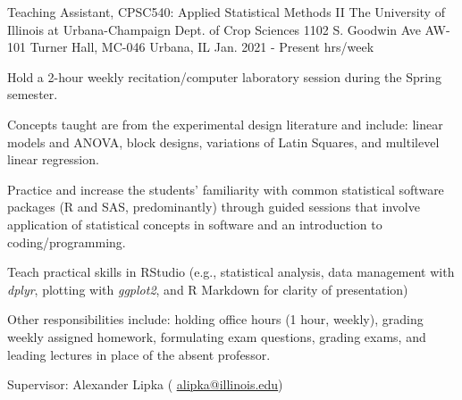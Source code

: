 \begin{cventries}
  \cventry
    {Teaching Assistant, CPSC540: Applied Statistical Methods II} %
    {The University of Illinois at Urbana-Champaign \newline Dept. of Crop Sciences } %
    {1102 S. Goodwin Ave \newline AW-101 Turner Hall, MC-046
    Urbana, IL} %
    {Jan. 2021 - Present  hrs/week} %
    {
      \begin{cvitems} %
        \item {Hold a 2-hour weekly recitation/computer laboratory session during the Spring semester. }
        \item{Concepts taught are from the experimental design literature and include: linear models and ANOVA, block designs, variations of Latin Squares, and multilevel linear regression.}
        \item {Practice and increase the students’ familiarity with common statistical software packages (R and SAS, predominantly) through guided sessions that involve application of statistical concepts in software and an introduction to coding/programming.}
        \item{Teach practical skills in RStudio (e.g., statistical analysis, data management with \textit{dplyr}, plotting with \textit{ggplot2}, and R Markdown for clarity of presentation)}
        \item {Other responsibilities include: holding office hours (1 hour, weekly), grading weekly assigned homework, formulating exam questions, grading exams, and leading lectures in place of the absent professor.}
        \item {Supervisor: Alexander Lipka ( \textcolor{navyblue}{\underline{\href{mailto:alipka@illinois.edu}{alipka@illinois.edu}}})}
      \end{cvitems}
    }





\end{cventries}
